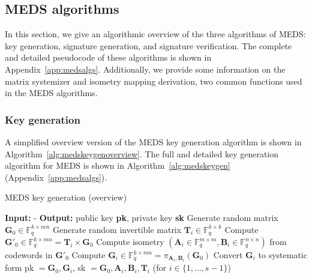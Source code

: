 \documentclass[11pt,a4paper]{report}
\theoremstyle{definition}
\begin{document}
\subsection{MEDS algorithms}
\label{sec:medsalgorithms}
In this section, we give an algorithmic overview of the three algorithms of MEDS: key generation, signature generation, and signature verification. The complete and detailed pseudocode of these algorithms is shown in Appendix~\ref{app:medsalgs}. Additionally, we provide some information on the matrix systemizer and isometry mapping derivation, two common functions used in the MEDS algorithms.

\subsubsection{Key generation}
A simplified overview version of the MEDS key generation algorithm is shown in Algorithm~\ref{alg:medskeygenoverview}. The full and detailed key generation algorithm for MEDS is shown in Algorithm~\ref{alg:medskeygen} (Appendix~\ref{app:medsalgs}).

\begin{algorithm}
  \caption{MEDS key generation (overview)}
  \label{alg:medskeygenoverview}
  \begin{algorithmic}[1]
    \State \textbf{Input:} -
    \State \textbf{Output:} public key \textbf{pk}, private key \textbf{sk}
    \State Generate random matrix $\textbf{G}_0 \in \mathbb{F}_q^{k \times mn}$
    \State Generate random invertible matrix $\textbf{T}_i \in \mathbb{F}_q^{k \times k}$
    \State Compute $\textbf{G}'_{0} \in \mathbb{F}_q^{k \times mn} = \textbf{T}_i \times \textbf{G}_0$
    \State Compute isometry $(\textbf{A}_i \in \mathbb{F}_q^{m \times m}, \textbf{B}_i \in \mathbb{F}_q^{n \times n})$ from codewords in $\textbf{G}'_{0}$
    \State Compute $\textbf{G}_i \in \mathbb{F}_q^{k \times mn} = \pi_{\textbf{A}_i, \textbf{B}_i}(\textbf{G}_0)$
    \State Convert $\textbf{G}_i$ to systematic form
    \EndFor
    \State \Return pk $= \textbf{G}_0, \textbf{G}_i$, sk $= \textbf{G}_0, \textbf{A}_i, \textbf{B}_i, \textbf{T}_i$ (for $i \in \{1, \ldots, s - 1\}$)
  \end{algorithmic}
\end{algorithm}
\end{document}
